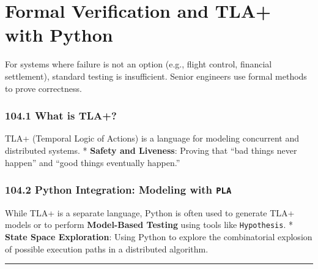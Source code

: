 \hypertarget{formal-verification-and-tla-with-python}{%
\chapter{Formal Verification and TLA+ with
Python}\label{formal-verification-and-tla-with-python}}

For systems where failure is not an option (e.g., flight control,
financial settlement), standard testing is insufficient. Senior
engineers use formal methods to prove correctness.

\hypertarget{what-is-tla}{%
\subsection{104.1 What is TLA+?}\label{what-is-tla}}

TLA+ (Temporal Logic of Actions) is a language for modeling concurrent
and distributed systems. * \textbf{Safety and Liveness}: Proving that
``bad things never happen'' and ``good things eventually happen.''

\hypertarget{python-integration-modeling-with-pla}{%
\subsection{\texorpdfstring{104.2 Python Integration: Modeling with
\texttt{PLA}}{104.2 Python Integration: Modeling with PLA}}\label{python-integration-modeling-with-pla}}

While TLA+ is a separate language, Python is often used to generate TLA+
models or to perform \textbf{Model-Based Testing} using tools like
\passthrough{\lstinline!Hypothesis!}. * \textbf{State Space
Exploration}: Using Python to explore the combinatorial explosion of
possible execution paths in a distributed algorithm.

\begin{center}\rule{0.5\linewidth}{0.5pt}\end{center}
